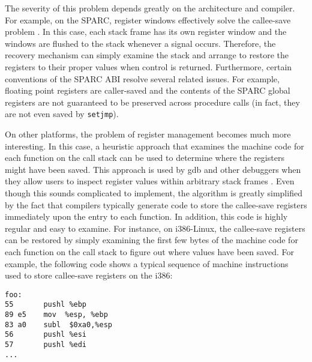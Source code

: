 The severity of this problem depends greatly on the architecture and
compiler.  For example, on the SPARC, register windows effectively
solve the callee-save problem \cite{sparc}.  In this case, each stack
frame has its own register window and the windows are flushed to the
stack whenever a signal occurs.  Therefore, the recovery mechanism can
simply examine the stack and arrange to restore the registers to their
proper values when control is returned.  Furthermore, certain
conventions of the SPARC ABI resolve several related issues. For
example, floating point registers are caller-saved and the contents of
the SPARC global registers are not guaranteed to be preserved across
procedure calls (in fact, they are not even saved by {\tt setjmp}).

On other platforms, the problem of register management becomes much
more interesting.  In this case, a heuristic approach that examines
the machine code for each function on the call stack can be used to
determine where the registers might have been saved.  This approach is
used by gdb and other debuggers when they allow users to inspect
register values within arbitrary stack frames \cite{gdb}.  Even though
this sounds complicated to implement, the algorithm is greatly
simplified by the fact that compilers typically generate code to store
the callee-save registers immediately upon the entry to each function.
In addition, this code is highly regular and easy to examine.  For
instance, on i386-Linux, the callee-save registers can be restored by
simply examining the first few bytes of the machine code for each
function on the call stack to figure out where values have been saved.
For example, the following code shows a typical sequence of machine instructions
used to store callee-save registers on the i386:

\begin{verbatim}
foo:
55       pushl %ebp
89 e5    mov  %esp, %ebp
83 a0    subl  $0xa0,%esp 
56       pushl %esi   
57       pushl %edi
...
\end{verbatim}

%
%

